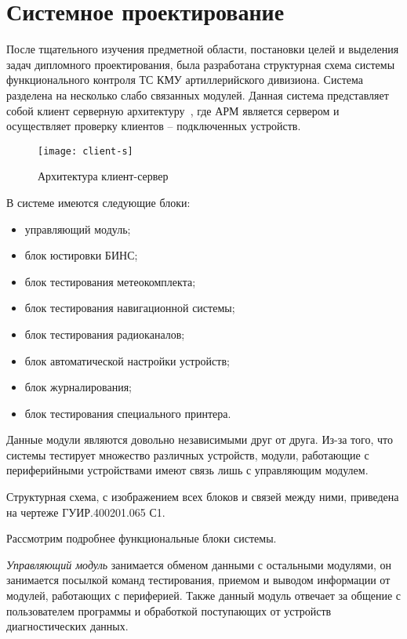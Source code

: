\section{Системное проектирование}
\label{sec:arch}

После тщательного изучения предметной области, постановки целей и выделения задач дипломного проектирования, была
разработана структурная схема системы функционального контроля ТС КМУ артиллерийского дивизиона.
Система разделена на несколько слабо связанных модулей.
Данная система представляет собой клиент серверную архитектуру~\cite{cl_s},
где АРМ является сервером и осуществляет проверку клиентов -- подключенных устройств.

\begin{figure}[ht]
	\centering
	\texttt{[image: client-s]}
	\caption{Архитектура клиент-сервер~\cite{cl_s}}
	\label{fig:sec_arch:client}
\end{figure}

В системе имеются следующие блоки:
\begin{itemize}
	\item управляющий модуль;
	\item блок юстировки БИНС;
	\item блок тестирования метеокомплекта;
	\item блок тестирования навигационной системы;
	\item блок тестирования радиоканалов;
	\item блок автоматической настройки устройств;
	\item блок журналирования;
	\item блок тестирования специального принтера.
\end{itemize}

Данные модули являются довольно независимыми друг от друга. Из-за того, что системы тестирует множество различных
устройств, модули, работающие с периферийными устройствами имеют связь лишь с управляющим модулем.

Структурная схема, с изображением всех блоков и связей между ними, приведена на чертеже ГУИР.400201.065 С1.

Рассмотрим подробнее функциональные блоки системы.

\textit{Управляющий модуль} занимается обменом данными с остальными модулями, он занимается посылкой команд
тестирования, приемом и выводом информации от модулей, работающих с периферией. Также данный модуль отвечает за общение
с пользователем программы и обработкой поступающих от устройств диагностических данных.

